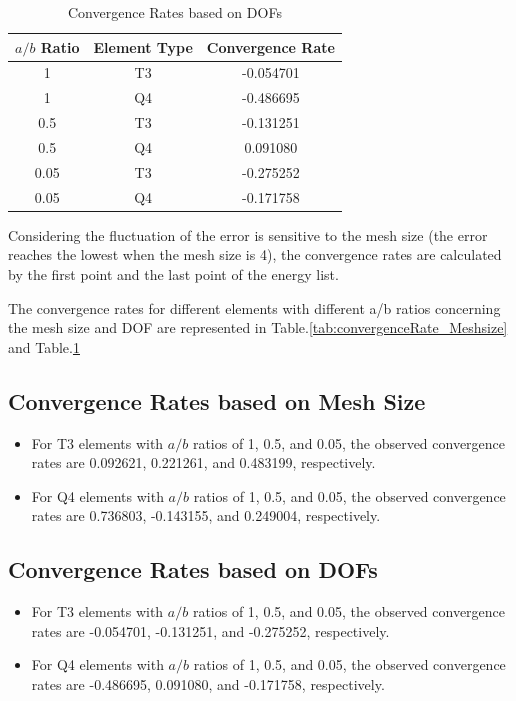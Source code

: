 \documentclass[twoside,twocolumn,10pt]{article}
\begin{document}
\begin{table}[!ht]
    \centering
    \caption{Convergence Rates based on DOFs}
    \begin{tabular}{|c|c|c|}
    \hline
    \(a/b\) Ratio & Element Type & Convergence Rate\\
    \hline
    1 & T3 & -0.054701 \\
    1 & Q4 & -0.486695 \\
    0.5 & T3 & -0.131251 \\
    0.5 & Q4 & 0.091080 \\
    0.05 & T3 & -0.275252 \\
    0.05 & Q4 & -0.171758 \\
    \hline
    \end{tabular}
  \label{tab:convergenceRate_DOF}
\end{table}

Considering the fluctuation of the error is sensitive to the mesh size (the error reaches the lowest when the mesh size is 4), the convergence rates are calculated by the first point and the last point of the energy list.

The convergence rates for different elements with different a/b ratios concerning the mesh size and DOF are represented in Table.\ref{tab:convergenceRate_Meshsize} and Table.\ref{tab:convergenceRate_DOF}

\subsection*{Convergence Rates based on Mesh Size}

\begin{itemize}
    \item For T3 elements with \(a/b\) ratios of 1, 0.5, and 0.05, the observed convergence rates are 0.092621, 0.221261, and 0.483199, respectively.
    \item For Q4 elements with \(a/b\) ratios of 1, 0.5, and 0.05, the observed convergence rates are 0.736803, -0.143155, and 0.249004, respectively.
\end{itemize}

\subsection*{Convergence Rates based on DOFs}

\begin{itemize}
    \item For T3 elements with \(a/b\) ratios of 1, 0.5, and 0.05, the observed convergence rates are -0.054701, -0.131251, and -0.275252, respectively. 
    \item For Q4 elements with \(a/b\) ratios of 1, 0.5, and 0.05, the observed convergence rates are -0.486695, 0.091080, and -0.171758, respectively. 
\end{itemize}
\end{document}
